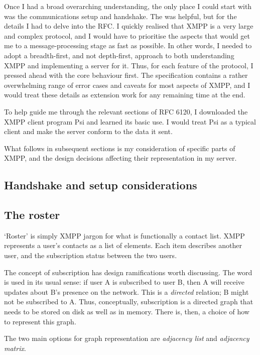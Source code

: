 Once I had a broad overarching understanding, the only place I could start with was the communications setup and handshake. The  was helpful, but for the details I had to delve into the RFC. I quickly realised that XMPP is a very large and complex protocol, and I would have to prioritise the aspects that would get me to a message-processing stage as fast as possible. In other words, I needed to adopt a breadth-first, and not depth-first, approach to both understanding XMPP and implementing a server for it. Thus, for each feature of the protocol, I pressed ahead with the core behaviour first. The specification contains a rather overwhelming range of error cases and caveats for most aspects of XMPP, and I would treat these details as extension work for any remaining time at the end.

To help guide me through the relevant sections of RFC 6120, I downloaded the XMPP client program Psi\cite{Psi-IM} and learned its basic use. I would treat Psi as a typical client and make the server conform to the data it sent.

What follows in subsequent sections is my consideration of specific parts of XMPP, and the design decisions affecting their representation in my server.

\subsection{Handshake and setup considerations}

\subsection{The roster}
`Roster' is simply XMPP jargon for what is functionally a contact list. XMPP represents a user's contacts as a list of  elements. Each item describes another user, and the subscription status between the two users.

The concept of subscription has design ramifications worth discussing. The word is used in its usual sense: if user A is subscribed to user B, then A will receive updates about B's presence on the network. This is a \emph{directed} relation; B might not be subscribed to A. Thus, conceptually, subscription is a directed graph that needs to be stored on disk as well as in memory. There is, then, a choice of how to represent this graph.

The two main options for graph representation are \emph{adjacency list} and \emph{adjacency matrix}.

